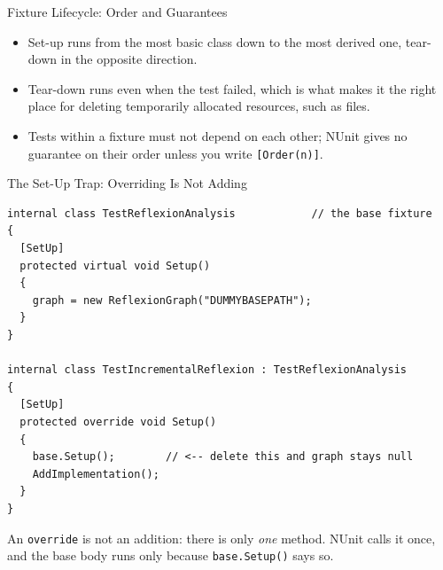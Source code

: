 \begin{frame}{Fixture Lifecycle: Order and Guarantees}
  \begin{itemize}
    \item Set-up runs from the most basic class down to the most derived one,
      tear-down in the opposite direction.
    \item Tear-down runs even when the test failed, which is what makes it the
      right place for deleting temporarily allocated resources, such as files.
    \item Tests within a fixture must not depend on each other; NUnit gives no
      guarantee on their order unless you write \texttt{[Order(n)]}.
  \end{itemize}
  \vspace{2ex}

\end{frame}

\begin{frame}[fragile]{The Set-Up Trap: Overriding Is Not Adding}
  \begin{lstlisting}[basicstyle=\scriptsize\ttfamily]
internal class TestReflexionAnalysis            // the base fixture
{
  [SetUp]
  protected virtual void Setup()
  {
    graph = new ReflexionGraph("DUMMYBASEPATH");
  }
}

internal class TestIncrementalReflexion : TestReflexionAnalysis
{
  [SetUp]
  protected override void Setup()
  {
    base.Setup();        // <-- delete this and graph stays null
    AddImplementation();
  }
}
  \end{lstlisting}

  An \texttt{override} is not an addition: there is only \emph{one} method.
  NUnit calls it once, and the base body runs only because
  \texttt{base.Setup()} says so.
\end{frame}

